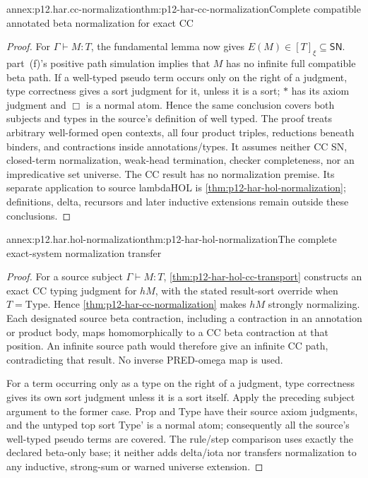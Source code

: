 \begin{annexitem}{annex:p12.har.cc-normalization}{thm:p12-har-cc-normalization}{Complete compatible annotated beta normalization for exact CC}
\begin{proof}
For \(\Gamma\vdash M:T\), the fundamental lemma now gives
\(E(M)\in[T]_\xi\subseteq\mathsf{SN}\). part~(f)'s positive path
simulation implies that \(M\) has no infinite full compatible beta
path. If a well-typed pseudo term occurs only on the right of a judgment,
type correctness gives a sort judgment for it, unless it is a sort;
\(\ast\) has its axiom judgment and \(\Box\) is a normal atom.
Hence the same conclusion covers both subjects and types in the
source's definition of well typed. The proof treats arbitrary well-formed
open contexts, all four product triples, reductions beneath binders,
and contractions inside annotations/types. It assumes neither CC SN,
closed-term normalization, weak-head termination, checker completeness,
nor an impredicative set universe. The CC result has no normalization premise. Its separate application to source lambdaHOL is \cref{thm:p12-har-hol-normalization}; definitions, delta, recursors and later inductive extensions remain outside these conclusions.
\end{proof}
\end{annexitem}

\begin{annexitem}{annex:p12.har.hol-normalization}{thm:p12-har-hol-normalization}{The complete exact-system normalization transfer}
\begin{proof}
For a source subject \(\Gamma\vdash M:T\),
\cref{thm:p12-har-hol-cc-transport} constructs an exact CC typing
judgment for \(hM\), with the stated result-sort override when
\(T=\mathrm{Type}\). Hence \cref{thm:p12-har-cc-normalization}
makes \(hM\) strongly normalizing. Each designated source beta
contraction, including a contraction in an annotation or product body,
maps homomorphically to a CC beta contraction at that position.
An infinite source path would therefore give an infinite CC path,
contradicting that result. No inverse PRED-omega map is used.

For a term occurring only as a type on the right of a judgment,
type correctness gives its own sort judgment unless it is a sort
itself. Apply the preceding subject argument to the former case.
Prop and Type have their source axiom judgments, and the untyped
top sort Type' is a normal atom; consequently all the source's
well-typed pseudo terms are covered. The rule/step comparison uses
exactly the declared beta-only base; it neither adds delta/iota nor
transfers normalization to any inductive, strong-sum or warned
universe extension.
\end{proof}
\end{annexitem}

